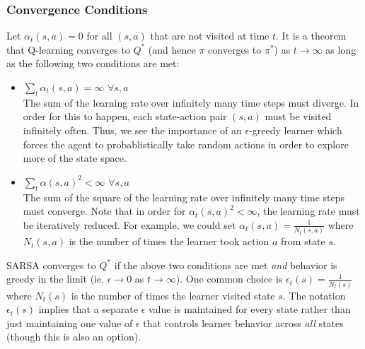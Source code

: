 \subsubsection{Convergence Conditions}
Let $\alpha_t(s, a) = 0$ for all $(s, a)$ that are not visited at time $t$. It is a theorem that Q-learning converges to $Q^*$ (and hence $\pi$ converges to $\pi^*$) as $t \rightarrow \infty$ as long as the following two conditions are met:
\begin{itemize}
    \item $\sum_t\alpha_t(s, a) = \infty$ $\forall s, a$\\
    The sum of the learning rate over infinitely many time steps must diverge. In order for this to happen, each state-action pair $(s, a)$ must be visited infinitely often. Thus, we see the importance of an $\epsilon$-greedy learner which forces the agent to probablistically take random actions in order to explore more of the state space.
    \item $\sum_t\alpha(s, a)^2 < \infty$ $\forall s, a$\\
    The sum of the square of the learning rate over infinitely many time steps must converge. Note that in order for $\alpha_t(s, a)^2 < \infty$, the learning rate must be iteratively reduced. For example, we could set $\alpha_t(s, a) = \frac{1}{N_t(s, a)}$ where $N_t(s, a)$ is the number of times the learner took action $a$ from state $s$.
\end{itemize}
SARSA converges to $Q^*$ if the above two conditions are met \textit{and} behavior is greedy in the limit (ie. $\epsilon \rightarrow 0$ as $t \rightarrow \infty$). One common choice is $\epsilon_t(s) = \frac{1}{N_t(s)}$ where $N_t(s)$ is the number of times the learner visited state $s$. The notation $\epsilon_t(s)$ implies that a separate $\epsilon$ value is maintained for every state rather than just maintaining one value of $\epsilon$ that controls learner behavior across \textit{all} states (though this is also an option).
